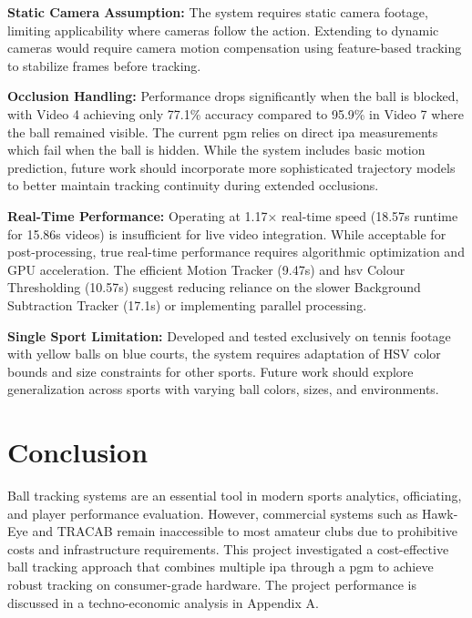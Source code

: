 \documentclass[12pt,a4paper]{article}
\begin{document}
\textbf{Static Camera Assumption:} The system requires static camera footage, limiting applicability where cameras follow the action. Extending to dynamic cameras would require camera motion compensation using feature-based tracking to stabilize frames before tracking.

\textbf{Occlusion Handling:} Performance drops significantly when the ball is blocked, with Video 4 achieving only 77.1\% accuracy compared to 95.9\% in Video 7 where the ball remained visible. The current \acs{pgm} relies on direct \acs{ipa} measurements which fail when the ball is hidden. While the system includes basic motion prediction, future work should incorporate more sophisticated trajectory models to better maintain tracking continuity during extended occlusions.

\textbf{Real-Time Performance:} Operating at 1.17× real-time speed (18.57s runtime for 15.86s videos) is insufficient for live video integration. While acceptable for post-processing, true real-time performance requires algorithmic optimization and GPU acceleration. The efficient Motion Tracker (9.47s) and \acs{hsv} Colour Thresholding (10.57s) suggest reducing reliance on the slower Background Subtraction Tracker (17.1s) or implementing parallel processing.

\textbf{Single Sport Limitation:} Developed and tested exclusively on tennis footage with yellow balls on blue courts, the system requires adaptation of HSV color bounds and size constraints for other sports. Future work should explore generalization across sports with varying ball colors, sizes, and environments.

\newpage
\section{Conclusion}
Ball tracking systems are an essential tool in modern sports analytics, officiating, and player performance evaluation. However, commercial systems such as Hawk-Eye and TRACAB remain inaccessible to most amateur clubs due to prohibitive costs and infrastructure requirements. This project investigated a cost-effective ball tracking approach that combines multiple \acl{ipa} through a \acl{pgm} to achieve robust tracking on consumer-grade hardware. The project performance is discussed in a techno-economic analysis in Appendix A.
\end{document}
